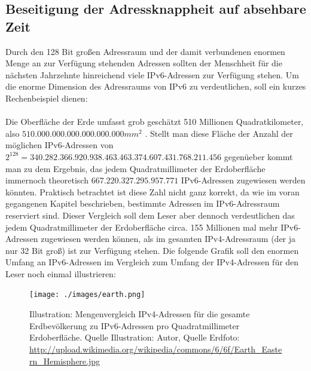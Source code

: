\documentclass[a4paper,12pt]{scrartcl}
\begin{document}
\subsection{Beseitigung der Adressknappheit auf absehbare Zeit}
Durch den 128 Bit gro{\ss}en Adressraum und der damit verbundenen enormen Menge an zur Verf\"ugung stehenden Adressen sollten der Menschheit f\"ur die n\"achsten Jahrzehnte hinreichend viele IPv6-Adressen zur Verfügung stehen.  Um die enorme Dimension des Adressraums von IPv6 zu verdeutlichen, soll ein kurzes Rechenbeispiel dienen:\\
\\
Die Oberfläche der Erde umfasst grob geschätzt 510 Millionen Quadratkilometer, also $510.000.000.000.000.000.000 mm^2$ . Stellt man diese Fl\"ache der Anzahl der m\"oglichen IPv6-Adressen von $2^{128} = 340.282.366.920.938.463.463.374.607.431.768.211.456$ gegen\"ueber kommt man zu dem Ergebnis, das jedem Quadratmillimeter der Erdoberfl\"ache immernoch theoretisch $667.220.327.295.957.771 $ IPv6-Adressen zugewiesen werden k\"onnten. Praktisch betrachtet ist diese Zahl nicht ganz korrekt, da wie im voran gegangenen Kapitel beschrieben, bestimmte Adressen im IPv6-Adressraum reserviert sind. Dieser Vergleich soll dem Leser aber dennoch verdeutlichen das jedem Quadratmillimeter der Erdoberfl\"ache circa. 155 Millionen mal mehr IPv6-Adressen zugewiesen werden k\"onnen, als im gesamten IPv4-Adressraum (der ja nur 32 Bit gro{\ss}) ist zur Verf\"ugung stehen. Die folgende Grafik soll den enormen Umfang an IPv6-Adressen im Vergleich zum Umfang der IPv4-Adressen f\"ur den Leser noch einmal illustrieren:

\clearpage

\begin{figure}[htb]
\begin{center}
 \texttt{[image: ./images/earth.png]}
 \end{center}
\caption[Illustration: Mengenvergleich IPv4-Adressen f\"ur die gesamte Erdbev\"olkerung zu IPv6-Adressen pro Quadratmillimeter Erdoberfl\"ache. Quelle Illustration: Autor, Quelle Erdfoto: \url{http://upload.wikimedia.org/wikipedia/commons/6/6f/Earth_Eastern_Hemisphere.jpg}]{\label{earth}Illustration: Mengenvergleich IPv4-Adressen f\"ur die gesamte Erdbev\"olkerung zu IPv6-Adressen pro Quadratmillimeter Erdoberfl\"ache.  Quelle Illustration: Autor, Quelle Erdfoto: \url{http://upload.wikimedia.org/wikipedia/commons/6/6f/Earth_Eastern_Hemisphere.jpg}}
\end{figure}
\end{document}
